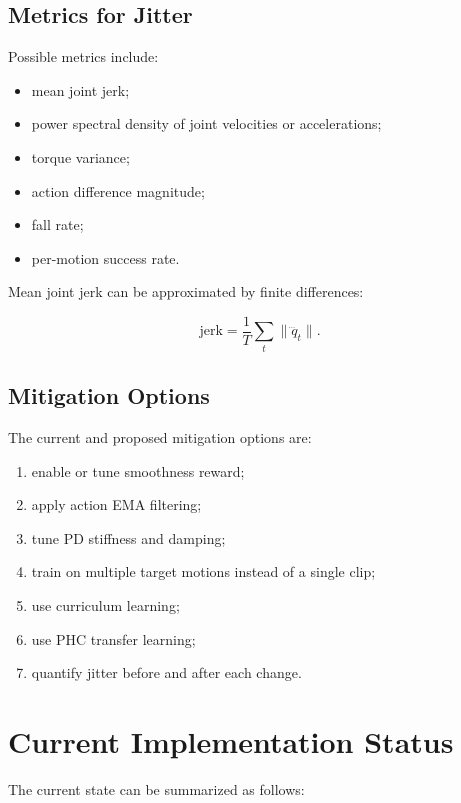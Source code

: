 \documentclass[11pt,a4paper]{article}
\begin{document}
\subsection{Metrics for Jitter}

Possible metrics include:

\begin{itemize}[leftmargin=2em]
    \item mean joint jerk;
    \item power spectral density of joint velocities or accelerations;
    \item torque variance;
    \item action difference magnitude;
    \item fall rate;
    \item per-motion success rate.
\end{itemize}

Mean joint jerk can be approximated by finite differences:

\begin{equation}
    \mathrm{jerk} = \frac{1}{T}\sum_t \|\dddot{q}_t\|.
\end{equation}

\subsection{Mitigation Options}

The current and proposed mitigation options are:

\begin{enumerate}[leftmargin=2em]
    \item enable or tune smoothness reward;
    \item apply action EMA filtering;
    \item tune PD stiffness and damping;
    \item train on multiple target motions instead of a single clip;
    \item use curriculum learning;
    \item use PHC transfer learning;
    \item quantify jitter before and after each change.
\end{enumerate}

\section{Current Implementation Status}

The current state can be summarized as follows:
\end{document}
